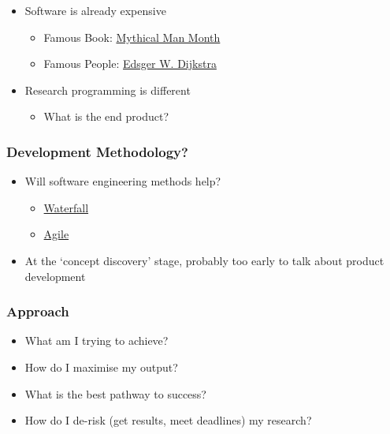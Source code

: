 \begin{itemize}
\itemsep1pt\parskip0pt
\item
  Software is already expensive

  \begin{itemize}
  \itemsep1pt\parskip0pt
  \item
    Famous Book:
    \href{http://www.amazon.co.uk/Mythical-Man-month-Essays-Software-Engineering/dp/0201835959/ref=sr_1_1?ie=UTF8\&qid=1452507457\&sr=8-1\&keywords=mythical+man+month}{Mythical
    Man Month}
  \item
    Famous People: \href{https://www.cs.utexas.edu/users/EWD/}{Edsger W.
    Dijkstra}
  \end{itemize}
\item
  Research programming is different

  \begin{itemize}
  \itemsep1pt\parskip0pt
  \item
    What is the end product?
  \end{itemize}
\end{itemize}

\subsubsection{Development Methodology?}\label{development-methodology}

\begin{itemize}
\itemsep1pt\parskip0pt
\item
  Will software engineering methods help?

  \begin{itemize}
  \itemsep1pt\parskip0pt
  \item
    \href{https://en.wikipedia.org/wiki/Waterfall_model}{Waterfall}
  \item
    \href{https://en.wikipedia.org/wiki/Agile_software_development}{Agile}
  \end{itemize}
\item
  At the `concept discovery' stage, probably too early to talk about
  product development
\end{itemize}

\subsubsection{Approach}\label{approach}

\begin{itemize}
\itemsep1pt\parskip0pt
\item
  What am I trying to achieve?
\item
  How do I maximise my output?
\item
  What is the best pathway to success?
\item
  How do I de-risk (get results, meet deadlines) my research?
\end{itemize}

